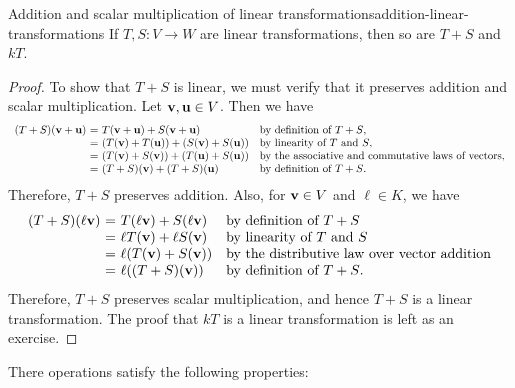 \begin{proposition}{Addition and scalar multiplication of linear transformations}{addition-linear-transformations}
  If $T,S:V\to W$ are linear transformations, then so are $T+S$ and $kT$.
\end{proposition}

\begin{proof}
  To show that $T+S$ is linear, we must verify that it preserves
  addition and scalar multiplication. Let $\mbox{\bf v},\mbox{\bf u}\in
  V$. Then we have
  \begin{equation*}
    \begin{array}{r@{~}c@{~}ll}
      (T+S)(\vect{v}+\vect{u})
      &=& T(\vect{v}+\vect{u}) + S(\vect{v}+\vect{u})
      & \mbox{by definition of $T+S$,} \\
      &=& (T(\vect{v}) + T(\vect{u})) + (S(\vect{v}) + S(\vect{u}))
      & \mbox{by linearity of $T$ and $S$,} \\
      &=& (T(\vect{v}) + S(\vect{v})) + (T(\vect{u}) + S(\vect{u}))
      & \mbox{by the associative and commutative laws of vectors,} \\
      &=& (T+S)(\vect{v}) + (T+S)(\vect{u})
      & \mbox{by definition of $T+S$.}
    \end{array}
  \end{equation*}
  Therefore, $T+S$ preserves addition. Also, for $\mbox{\bf v}\in V$ and
  $\ell\in K$, we have
  \begin{equation*}
    \begin{array}{r@{~}c@{~}ll}
      (T+S)(\ell\vect{v})
      &=& T(\ell\vect{v}) + S(\ell\vect{v})
      & \mbox{by definition of $T+S$} \\
      &=& \ell T(\vect{v}) + \ell S(\vect{v})
      & \mbox{by linearity of $T$ and $S$} \\
      &=& \ell(T(\vect{v}) + S(\vect{v}))
      & \mbox{by the distributive law over vector addition} \\
      &=& \ell((T+S)(\vect{v}))
      & \mbox{by definition of $T+S$.}
    \end{array}
  \end{equation*}
  Therefore, $T+S$ preserves scalar multiplication, and hence $T+S$ is
  a linear transformation. The proof that $kT$ is a linear
  transformation is left as an exercise.
\end{proof}

There operations satisfy the following properties:

